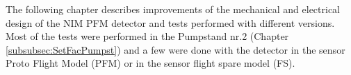 	The following chapter describes improvements of the mechanical and electrical design of the NIM PFM detector and tests performed with different versions. Most of the tests were performed in the Pumpstand nr.2 (Chapter \ref{subsubsec:SetFacPumpst}) and a few were done with the detector in the sensor Proto Flight Model (PFM) or in the sensor flight spare model (FS).\\
	
	
